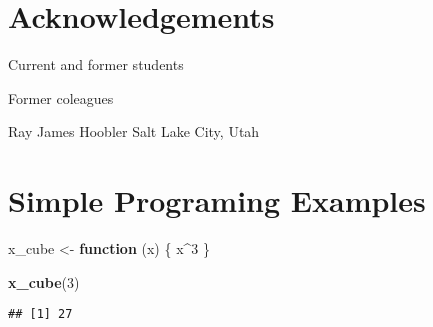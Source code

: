 \documentclass[]{book}
\newenvironment{Shaded}{\begin{snugshade}}{\end{snugshade}}
\newcommand{\ControlFlowTok}[1]{\textcolor[rgb]{0.13,0.29,0.53}{\textbf{#1}}}
\newcommand{\DataTypeTok}[1]{\textcolor[rgb]{0.13,0.29,0.53}{#1}}
\newcommand{\DecValTok}[1]{\textcolor[rgb]{0.00,0.00,0.81}{#1}}
\newcommand{\FloatTok}[1]{\textcolor[rgb]{0.00,0.00,0.81}{#1}}
\newcommand{\KeywordTok}[1]{\textcolor[rgb]{0.13,0.29,0.53}{\textbf{#1}}}
\newcommand{\NormalTok}[1]{#1}
\newcommand{\OperatorTok}[1]{\textcolor[rgb]{0.81,0.36,0.00}{\textbf{#1}}}
\newcommand{\StringTok}[1]{\textcolor[rgb]{0.31,0.60,0.02}{#1}}
\theoremstyle{definition}
\theoremstyle{definition}
\theoremstyle{definition}
\theoremstyle{remark}
\begin{document}
\hypertarget{acknowledgements}{%
\section*{Acknowledgements}\label{acknowledgements}}

Current and former students

Former coleagues

Ray James Hoobler Salt Lake City, Utah

\hypertarget{simple-programing-examples}{%
\section{Simple Programing Examples}\label{simple-programing-examples}}

\begin{Shaded}
\begin{Highlighting}[]
\NormalTok{x_cube <-}\StringTok{ }\ControlFlowTok{function}\NormalTok{ (x) \{}
\NormalTok{  x}\OperatorTok{^}\DecValTok{3}
\NormalTok{\}}

\KeywordTok{x_cube}\NormalTok{(}\DecValTok{3}\NormalTok{)}
\end{Highlighting}
\end{Shaded}

\begin{verbatim}
## [1] 27
\end{verbatim}

\begin{Shaded}
\end{Shaded}
\end{document}
